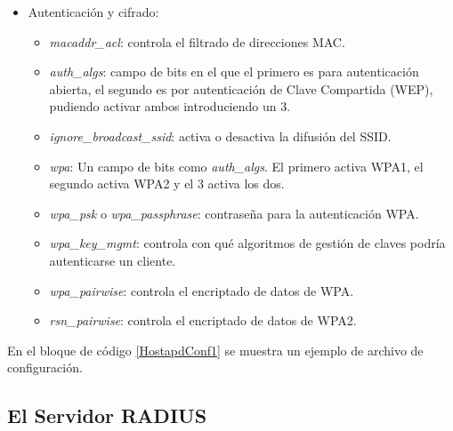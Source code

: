 \begin{itemize}
\begin{itemize}
\end{itemize}
\item Autenticación y cifrado:
\begin{itemize}
\item \emph{macaddr\_acl}: controla el filtrado de direcciones \acrshort{MAC}.
\item \emph{auth\_algs}: campo de bits en el que el primero es para autenticación abierta, el segundo es por autenticación de Clave Compartida (\acrshort{WEP}), pudiendo activar ambos introduciendo un 3.
\item \emph{ignore\_broadcast\_ssid}: activa o desactiva la difusión del \acrshort{SSID}.
\item \emph{wpa}: Un campo de bits como \emph{auth\_algs}. El primero activa \acrshort{WPA}1, el segundo activa \acrshort{WPA2} y el 3 activa los dos.
\item \emph{wpa\_psk} o \emph{wpa\_passphrase}: contraseña para la autenticación \acrshort{WPA}.
\item \emph{wpa\_key\_mgmt}: controla con qué algoritmos de gestión de claves podría autenticarse un cliente.
\item \emph{wpa\_pairwise}: controla el encriptado de datos de \acrshort{WPA}.
\item \emph{rsn\_pairwise}: controla el encriptado de datos de \acrshort{WPA2}.
\end{itemize}
\end{itemize}

En el bloque de código \ref{HostapdConf1} se muestra un ejemplo de archivo de configuración. 


\subsection{El Servidor RADIUS}

